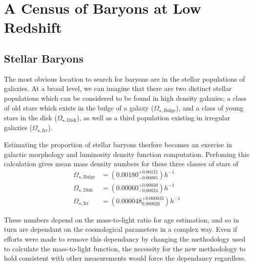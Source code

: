 \section{A Census of Baryons at Low Redshift}
\subsection{Stellar Baryons}
The most obvious location to search for baryons are in the stellar populations of galaxies. At a broad level, we can imagine that there are two distinct stellar populations which can be considered to be found in high density galaxies; a class of old stars which exists in the bulge of a galaxy ($\Omega_{\star,\text{Bulge}}$), and a class of young stars in the disk ($\Omega_{\star,\text{Disk}} $), as well as a third population existing in irregular galaxies ($\Omega_{\star,\text{Irr}}$).

\par Estimating the proportion of stellar baryons therfore becomes an exercise in galactic morphology and luminosity density function computation. Perfoming this calculation gives mean mass density numbers for these three classes of stars of
\begin{align*}
\Omega_{\star,\text{Bulge}} &= (0.00180^{+0.00121}_{-0.00085}) h^{-1} \\
\Omega_{\star,\text{Disk}} &= (0.00060^{+0.00030}_{-0.00024}) h^{-1} \\
\Omega_{\star,\text{Irr}} &= (0.000048^{+0.000033}_{0.000026}) h^{-1}
\end{align*}

These numbers depend on the mass-to-light ratio for age estimation, and so in turn are dependant on the cosmological parameters in a complex way. Even if efforts were made to remove this dependancy by changing the methodology used to calculate the mass-to-light function, the necessity for the new methodology to hold consistent with other measurements would force the dependancy regardless.

